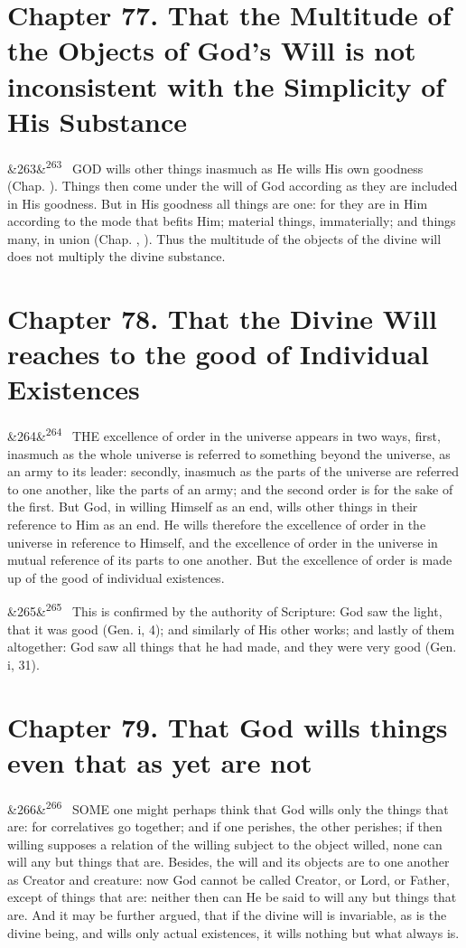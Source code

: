 \documentclass[12pt]{article}
\newcommand{\para}[1][]{\par\noindent\ifx&#1&\else\textsuperscript{\footnotesize #1}~\fi}
\begin{document}
\section*{Chapter 77. That the Multitude of the Objects of God's Will is not inconsistent with the Simplicity of His Substance}

\para[263] GOD wills other things inasmuch as He wills His own goodness (Chap. ). Things then come under the will of God according as they are included in His goodness. But in His goodness all things are one: for they are in Him according to the mode that befits Him; material things, immaterially; and things many, in union (Chap. , ). Thus the multitude of the objects of the divine will does not multiply the divine substance.

\section*{Chapter 78. That the Divine Will reaches to the good of Individual Existences}

\para[264] THE excellence of order in the universe appears in two ways, first, inasmuch as the whole universe is referred to something beyond the universe, as an army to its leader: secondly, inasmuch as the parts of the universe are referred to one another, like the parts of an army; and the second order is for the sake of the first. But God, in willing Himself as an end, wills other things in their reference to Him as an end. He wills therefore the excellence of order in the universe in reference to Himself, and the excellence of order in the universe in mutual reference of its parts to one another. But the excellence of order is made up of the good of individual existences.

\para[265] This is confirmed by the authority of Scripture: God saw the light, that it was good (Gen. i, 4); and similarly of His other works; and lastly of them altogether: God saw all things that he had made, and they were very good (Gen. i, 31).

\section*{Chapter 79. That God wills things even that as yet are not}

\para[266] SOME one might perhaps think that God wills only the things that are: for correlatives go together; and if one perishes, the other perishes; if then willing supposes a relation of the willing subject to the object willed, none can will any but things that are. Besides, the will and its objects are to one another as Creator and creature: now God cannot be called Creator, or Lord, or Father, except of things that are: neither then can He be said to will any but things that are. And it may be further argued, that if the divine will is invariable, as is the divine being, and wills only actual existences, it wills nothing but what always is.
\end{document}
